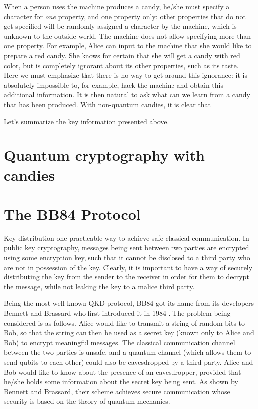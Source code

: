 \documentclass{article}
\def \todo #1{\textcolor{red}{#1}}
\begin{document}
When a person uses the machine produces a candy, he/she must specify a character for \textit{one} property, and one property only: other properties that do not get specified will be randomly assigned a character by the machine, which is unknown to the outside world.
The machine does not allow specifying more than one property.
For example, Alice can input to the machine that she would like to prepare a red candy.
She knows for certain that she will get a candy with red color, but is completely ignorant about its other properties, such as its taste.
Here we must emphasize that there is no way to get around this ignorance: it is absolutely impossible to, for example, hack the machine and obtain this additional information.
It is then natural to ask what can we learn from a candy that has been produced.
With non-quantum candies, it is clear that 

Let's summarize the key information presented above.


\section{Quantum cryptography with candies}


\section{The BB84 Protocol}
Key distribution one practicable way to achieve safe classical communication.
In public key cryptography, messages being sent between two parties are encrypted using some encryption key, such that it cannot be disclosed to a third party who are not in possession of the key.
Clearly, it is important to have a way of securely distributing the key from the sender to the receiver in order for them to decrypt the message, while not leaking the key to a malice third party.


Being the most well-known QKD protocol, BB84 got its name from its developers Bennett and Brassard who first introduced it in 1984 \cite{bennett1984quantum}.
The problem being considered is as follows.
Alice would like to transmit a string of random bits to Bob, so that the string can then be used as a secret key (known only to Alice and Bob) to encrypt meaningful messages.
The classical communication channel between the two parties is unsafe, and a quantum channel (which allows them to send qubits to each other) could also be eavesdropped by a third party.
Alice and Bob would like to know about the presence of an eavesdropper, provided that he/she holds some information about the secret key being sent.
As shown by Bennett and Brassard, their scheme achieves secure communication whose security is based on the theory of quantum mechanics.
\end{document}
